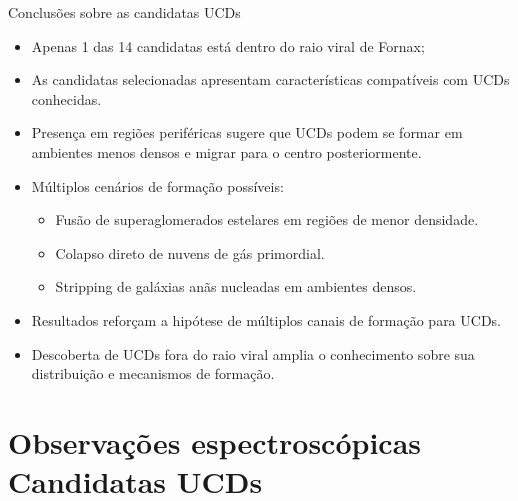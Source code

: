 \begin{frame}[c]{Conclusões sobre as candidatas UCDs}
    \begin{itemize}
        \item Apenas 1 das 14 candidatas está dentro do raio viral de Fornax;
        \item As candidatas selecionadas apresentam características compatíveis com UCDs conhecidas.
        \item Presença em regiões periféricas sugere que UCDs podem se formar em ambientes menos densos e migrar para o centro posteriormente.
        \item Múltiplos cenários de formação possíveis:
        \begin{itemize}
            \item Fusão de superaglomerados estelares em regiões de menor densidade.
            \item Colapso direto de nuvens de gás primordial.
            \item Stripping de galáxias anãs nucleadas em ambientes densos.
        \end{itemize}
        \item Resultados reforçam a hipótese de múltiplos canais de formação para UCDs.
        \item Descoberta de UCDs fora do raio viral amplia o conhecimento sobre sua distribuição e mecanismos de formação.
    \end{itemize}
\end{frame}

\section{Observações espectroscópicas Candidatas UCDs}

